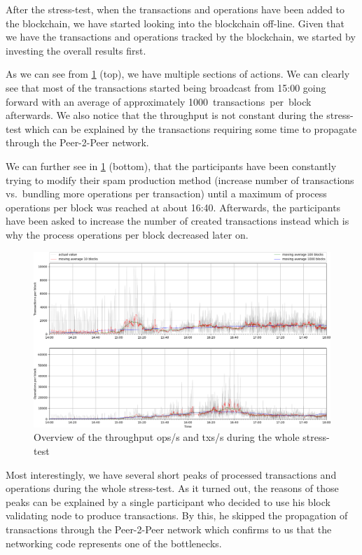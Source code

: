 After the stress-test, when the transactions and operations have been added to
the blockchain, we have started looking into the blockchain off-line. Given
that we have the transactions and operations tracked by the blockchain, we
started by investing the overall results first.

As we can see from \cref{fig:tpsall} (top), we have multiple sections of
actions. We can clearly see that most of the transactions started being
broadcast from 15:00 going forward with an average of approximately
\SI{1000}{transactions per block} afterwards. We also notice that the
throughput is not constant during the stress-test which can be explained by the
transactions requiring some time to propagate through the Peer-2-Peer network.

We can further see in \cref{fig:tpsall} (bottom), that the participants have
been constantly trying to modify their spam production method (increase number
of transactions vs.\ bundling more operations per transaction) until a maximum
of process operations per block was reached at about 16:40. Afterwards, the
participants have been asked to increase the number of created transactions
instead which is why the process operations per block decreased later on.

\begin{figure}[!htp]
 \centering
 \includegraphics[width=\linewidth]{figures/stress-test-overview.png}
 \caption{Overview of the throughput ops/s and txs/s during the whole stress-test}
 \label{fig:tpsall}
\end{figure}

Most interestingly, we have several short peaks of processed transactions and
operations during the whole stress-test. As it turned out, the reasons of those
peaks can be explained by a single participant who decided to use his
block validating node to produce transactions. By this, he skipped the
propagation of transactions through the Peer-2-Peer network which confirms to
us that the networking code represents one of the bottlenecks.

